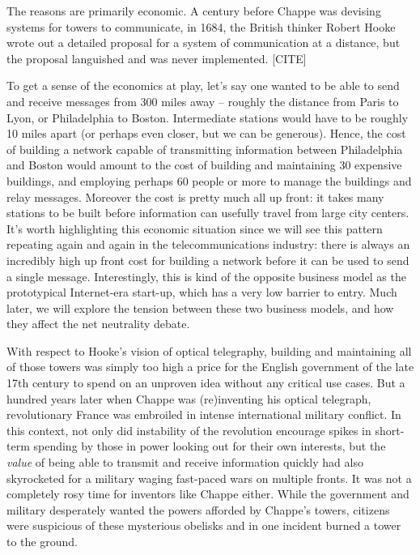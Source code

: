 \documentclass[UTF8]{book}
\begin{document}
\begin{CJK}{UTF8}{gbsn}
The reasons are primarily economic. A century before Chappe was devising systems for towers to communicate, in 1684, the British thinker Robert Hooke wrote out a detailed proposal for a system of communication at a distance, but the proposal languished and was never implemented. [CITE]

To get a sense of the economics at play, let's say one wanted to be able to send and receive messages from 300 miles away -- roughly the distance from Paris to Lyon, or Philadelphia to Boston. Intermediate stations would have to be roughly 10 miles apart (or perhaps even closer, but we can be generous). Hence, the cost of building a network capable of transmitting information between Philadelphia and Boston would amount to the cost of building and maintaining 30 expensive buildings, and employing perhaps 60 people or more to manage the buildings and relay messages. Moreover the cost is pretty much all up front: it takes many stations to be built before information can usefully travel from large city centers. It's worth highlighting this economic situation since we will see this pattern repeating again and again in the telecommunications industry: there is always an incredibly high up front cost for building a network before it can be used to send a single message. Interestingly, this is kind of the opposite business model as the prototypical Internet-era start-up, which has a very low barrier to entry. Much later, we will explore the tension between these two business models, and how they affect the net neutrality debate.

With respect to Hooke's vision of optical telegraphy, building and maintaining all of those towers was simply too high a price for the English government of the late 17th century to spend on an unproven idea without any critical use cases. But a hundred years later when Chappe was (re)inventing his optical telegraph, revolutionary France was embroiled in intense international military conflict. In this context, not only did instability of the revolution encourage spikes in short-term spending by those in power looking out for their own interests, but the \emph{value} of being able to transmit and receive information quickly had also skyrocketed for a military waging fast-paced wars on multiple fronts. It was not a completely rosy time for inventors like Chappe either. While the government and military desperately wanted the powers afforded by Chappe's towers, citizens were suspicious of these mysterious obelisks and in one incident burned a tower to the ground.


\end{CJK}
\end{document}
